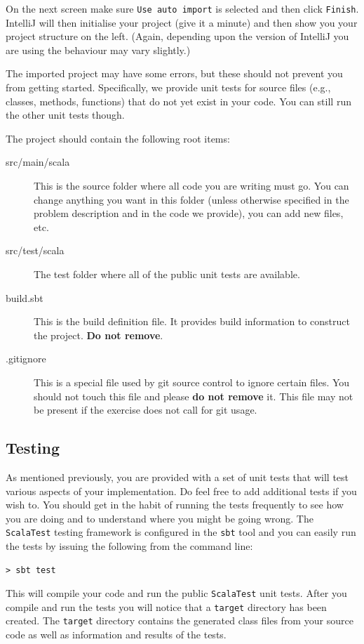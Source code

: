 \documentclass[12pt,a4paper]{exam}
\begin{document}
On the next screen make sure \verb!Use auto import! is selected and then click \verb!Finish!. 
IntelliJ will then initialise your project (give it a minute) and then show you your project structure 
on the left. (Again, depending upon the version of IntelliJ you are using the behaviour may vary slightly.)

The imported project may have some errors, but these should not prevent you from getting started. 
Specifically, we provide unit tests for source files (e.g., classes, methods, functions) 
that do not yet exist in your code. You can still run the other unit tests though.

The project should contain the following root items:
\begin{description}
\item[src/main/scala]
This is the source folder where all code you are writing must go. 
You can change anything you want in this folder (unless otherwise specified in the problem description and 
in the code we provide), you can add new files, etc.	

\item[src/test/scala]
The test folder where all of the public unit tests are available.
\item[build.sbt]
This is the build definition file. It provides build information to construct the project. \textbf{Do not remove}.
\item[.gitignore]
This is a special file used by git source control to ignore certain files. 
You should not touch this file and please \textbf{do not remove} it. 
This file may not be present if the exercise does not call for git usage.
\end{description}

\subsection*{Testing}

As mentioned previously, you are provided with a set of unit tests that will test various aspects of 
your implementation. Do feel free to add additional tests if you wish to.
You should get in the habit of running the tests frequently to see how you are doing and to understand 
where you might be going wrong. The \verb!ScalaTest! testing framework is configured in the \verb!sbt! 
tool and you can easily run the tests by issuing the following from the command line:
\begin{Verbatim}
> sbt test
\end{Verbatim}
This will compile your code and run the public \verb!ScalaTest! unit tests. 
After you compile and run the tests you will notice that a \verb!target! directory has been created. 
The \verb!target! directory contains the generated class files from your source code as 
well as information and results of the tests. 
\end{document}
